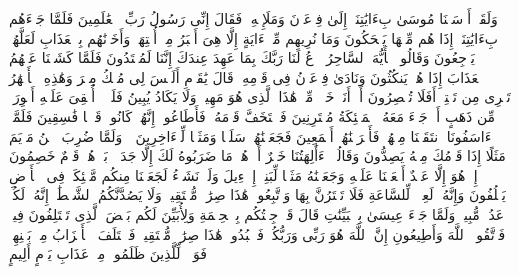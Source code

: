\startbuffer[\q:43:46]
وَلَقَدۡ أَرۡسَلۡنَا مُوسَىٰ بِءَایَٰتِنَاۤ إِلَىٰ فِرۡعَوۡنَ وَمَلَإِی۟هِۦ فَقَالَ إِنِّی رَسُولُ رَبِّ ٱلۡعَٰلَمِینَ%
\stopbuffer%
\startbuffer[\q:43:47]
فَلَمَّا جَاۤءَهُم بِءَایَٰتِنَاۤ إِذَا هُم مِّنۡهَا یَضۡحَكُونَ%
\stopbuffer%
\startbuffer[\q:43:48]
وَمَا نُرِیهِم مِّنۡ ءَایَةٍ إِلَّا هِیَ أَكۡبَرُ مِنۡ أُخۡتِهَاۖ وَأَخَذۡنَٰهُم بِٱلۡعَذَابِ لَعَلَّهُمۡ یَرۡجِعُونَ%
\stopbuffer%
\startbuffer[\q:43:49]
وَقَالُوا۟ یَٰۤأَیُّهَ ٱلسَّاحِرُ ٱدۡعُ لَنَا رَبَّكَ بِمَا عَهِدَ عِندَكَ إِنَّنَا لَمُهۡتَدُونَ%
\stopbuffer%
\startbuffer[\q:43:50]
فَلَمَّا كَشَفۡنَا عَنۡهُمُ ٱلۡعَذَابَ إِذَا هُمۡ یَنكُثُونَ%
\stopbuffer%
\startbuffer[\q:43:51]
وَنَادَىٰ فِرۡعَوۡنُ فِی قَوۡمِهِۦ قَالَ یَٰقَوۡمِ أَلَیۡسَ لِی مُلۡكُ مِصۡرَ وَهَٰذِهِ ٱلۡأَنۡهَٰرُ تَجۡرِی مِن تَحۡتِیۤۚ أَفَلَا تُبۡصِرُونَ%
\stopbuffer%
\startbuffer[\q:43:52]
أَمۡ أَنَا۠ خَیۡرࣱ مِّنۡ هَٰذَا ٱلَّذِی هُوَ مَهِینࣱ وَلَا یَكَادُ یُبِینُ%
\stopbuffer%
\startbuffer[\q:43:53]
فَلَوۡلَاۤ أُلۡقِیَ عَلَیۡهِ أَسۡوِرَةࣱ مِّن ذَهَبٍ أَوۡ جَاۤءَ مَعَهُ ٱلۡمَلَٰۤئِكَةُ مُقۡتَرِنِینَ%
\stopbuffer%
\startbuffer[\q:43:54]
فَٱسۡتَخَفَّ قَوۡمَهُۥ فَأَطَاعُوهُۚ إِنَّهُمۡ كَانُوا۟ قَوۡمࣰا فَٰسِقِینَ%
\stopbuffer%
\startbuffer[\q:43:55]
فَلَمَّاۤ ءَاسَفُونَا ٱنتَقَمۡنَا مِنۡهُمۡ فَأَغۡرَقۡنَٰهُمۡ أَجۡمَعِینَ%
\stopbuffer%
\startbuffer[\q:43:56]
فَجَعَلۡنَٰهُمۡ سَلَفࣰا وَمَثَلࣰا لِّلۡءَاخِرِینَ%
\stopbuffer%
\startbuffer[\q:43:57]
۞ وَلَمَّا ضُرِبَ ٱبۡنُ مَرۡیَمَ مَثَلًا إِذَا قَوۡمُكَ مِنۡهُ یَصِدُّونَ%
\stopbuffer%
\startbuffer[\q:43:58]
وَقَالُوۤا۟ ءَأَٰلِهَتُنَا خَیۡرٌ أَمۡ هُوَۚ مَا ضَرَبُوهُ لَكَ إِلَّا جَدَلَۢاۚ بَلۡ هُمۡ قَوۡمٌ خَصِمُونَ%
\stopbuffer%
\startbuffer[\q:43:59]
إِنۡ هُوَ إِلَّا عَبۡدٌ أَنۡعَمۡنَا عَلَیۡهِ وَجَعَلۡنَٰهُ مَثَلࣰا لِّبَنِیۤ إِسۡرَٰۤءِیلَ%
\stopbuffer%
\startbuffer[\q:43:60]
وَلَوۡ نَشَاۤءُ لَجَعَلۡنَا مِنكُم مَّلَٰۤئِكَةࣰ فِی ٱلۡأَرۡضِ یَخۡلُفُونَ%
\stopbuffer%
\startbuffer[\q:43:61]
وَإِنَّهُۥ لَعِلۡمࣱ لِّلسَّاعَةِ فَلَا تَمۡتَرُنَّ بِهَا وَٱتَّبِعُونِۚ هَٰذَا صِرَٰطࣱ مُّسۡتَقِیمࣱ%
\stopbuffer%
\startbuffer[\q:43:62]
وَلَا یَصُدَّنَّكُمُ ٱلشَّیۡطَٰنُۖ إِنَّهُۥ لَكُمۡ عَدُوࣱّ مُّبِینࣱ%
\stopbuffer%
\startbuffer[\q:43:63]
وَلَمَّا جَاۤءَ عِیسَىٰ بِٱلۡبَیِّنَٰتِ قَالَ قَدۡ جِئۡتُكُم بِٱلۡحِكۡمَةِ وَلِأُبَیِّنَ لَكُم بَعۡضَ ٱلَّذِی تَخۡتَلِفُونَ فِیهِۖ فَٱتَّقُوا۟ ٱللَّهَ وَأَطِیعُونِ%
\stopbuffer%
\startbuffer[\q:43:64]
إِنَّ ٱللَّهَ هُوَ رَبِّی وَرَبُّكُمۡ فَٱعۡبُدُوهُۚ هَٰذَا صِرَٰطࣱ مُّسۡتَقِیمࣱ%
\stopbuffer%
\startbuffer[\q:43:65]
فَٱخۡتَلَفَ ٱلۡأَحۡزَابُ مِنۢ بَیۡنِهِمۡۖ فَوَیۡلࣱ لِّلَّذِینَ ظَلَمُوا۟ مِنۡ عَذَابِ یَوۡمٍ أَلِیمٍ%
\stopbuffer%
\startbuffer[\q:43:66]
